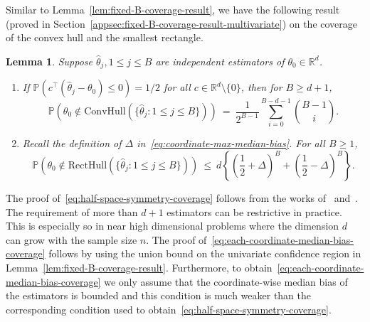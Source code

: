 \documentclass{article}
\newtheorem{lem}{Lemma}
\numberwithin{myalgctr}{section}
\begin{document}
Similar to Lemma~\ref{lem:fixed-B-coverage-result}, we have the following result (proved in Section~\ref{appsec:fixed-B-coverage-result-multivariate}) on the coverage of the convex hull and the smallest rectangle.
\begin{lem}\label{lem:fixed-B-coverage-result-multivariate}
Suppose $\widehat{\theta}_j, 1\le j\le B$ are independent estimators of $\theta_0\in\mathbb{R}^d$.
\begin{enumerate}
  \item If $\mathbb{P}(c^{\top}(\widehat{\theta}_j - \theta_0) \le 0) = 1/2$ for all $c\in\mathbb{R}^d\setminus\{0\}$, then for $B \ge d + 1$,
  \begin{equation}\label{eq:half-space-symmetry-coverage}
  \mathbb{P}\left(\theta_0 \notin \mathrm{ConvHull}(\{\widehat{\theta}_j: 1\le j\le B\})\right) ~=~ \frac{1}{2^{B-1}}\sum_{i=0}^{B-d-1}\binom{B-1}{i}.
  \end{equation}
  \item Recall the definition of $\Delta$ in~\eqref{eq:coordinate-max-median-bias}. For all $B \ge 1$,
  \begin{equation}\label{eq:each-coordinate-median-bias-coverage}
  \mathbb{P}\left(\theta_0 \notin \mathrm{RectHull}(\{\widehat{\theta}_j: 1\le j\le B\})\right) ~\le~ d\left\{\left(\frac{1}{2} + \Delta\right)^B + \left(\frac{1}{2} - \Delta\right)^B\right\}.
  \end{equation}
\end{enumerate} 
\end{lem} 
The proof of~\eqref{eq:half-space-symmetry-coverage} follows from the works of~\cite{wendel1962problem} and~\cite{wagner2001continuous}. The requirement of more than $d + 1$ estimators can be restrictive in practice. This is especially so in near high dimensional problems where the dimension $d$ can grow with the sample size $n$. The proof of~\eqref{eq:each-coordinate-median-bias-coverage} follows by using the union bound on the univariate confidence region in Lemma~\ref{lem:fixed-B-coverage-result}. Furthermore, to obtain~\eqref{eq:each-coordinate-median-bias-coverage} we only assume that the coordinate-wise median bias of the estimators is bounded and this condition is much weaker than the corresponding condition used 
to obtain~\eqref{eq:half-space-symmetry-coverage}.
\end{document}
